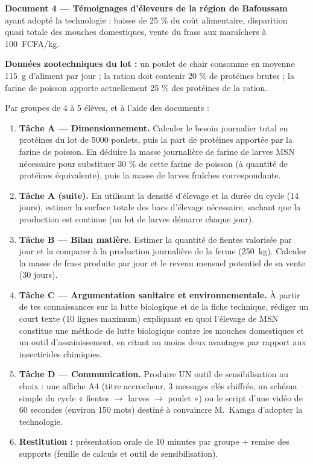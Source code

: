 \documentclass[11pt]{article}
\newcounter{popsec}
\newcounter{popsub}
\newcommand{\courssub}[1]{%
  \stepcounter{popsub}%
  \par\vspace{9pt}\noindent{\popxbold\fontsize{11.5}{13}\selectfont\color{popink}{\color{poporange}\thepopsec.\thepopsub}\hspace{6pt}#1}\par\nopagebreak\vspace{4pt}
}
\begin{document}
\textbf{Document 4 — Témoignages d'éleveurs de la région de Bafoussam} ayant adopté la technologie : baisse de 25 \% du coût alimentaire, disparition quasi totale des mouches domestiques, vente du frass aux maraîchers à \SI{100}{FCFA/kg}.

\textbf{Données zootechniques du lot :} un poulet de chair consomme en moyenne \SI{115}{g} d'aliment par jour ; la ration doit contenir 20 \% de protéines brutes ; la farine de poisson apporte actuellement 25 \% des protéines de la ration.

\courssub{Consignes}

Par groupes de 4 à 5 élèves, et à l'aide des documents :

\begin{enumerate}
\item \textbf{Tâche A — Dimensionnement.} Calculer le besoin journalier total en protéines du lot de \num{5000} poulets, puis la part de protéines apportée par la farine de poisson. En déduire la masse journalière de farine de larves MSN nécessaire pour substituer 30 \% de cette farine de poisson (à quantité de protéines équivalente), puis la masse de larves fraîches correspondante.
\item \textbf{Tâche A (suite).} En utilisant la densité d'élevage et la durée du cycle (14 jours), estimer la surface totale des bacs d'élevage nécessaire, sachant que la production est continue (un lot de larves démarre chaque jour).
\item \textbf{Tâche B — Bilan matière.} Estimer la quantité de fientes valorisée par jour et la comparer à la production journalière de la ferme (\SI{250}{kg}). Calculer la masse de frass produite par jour et le revenu mensuel potentiel de sa vente (30 jours).
\item \textbf{Tâche C — Argumentation sanitaire et environnementale.} À partir de tes connaissances sur la lutte biologique et de la fiche technique, rédiger un court texte (10 lignes maximum) expliquant en quoi l'élevage de MSN constitue une méthode de lutte biologique contre les mouches domestiques et un outil d'assainissement, en citant au moins deux avantages par rapport aux insecticides chimiques.
\item \textbf{Tâche D — Communication.} Produire UN outil de sensibilisation au choix : une affiche A4 (titre accrocheur, 3 messages clés chiffrés, un schéma simple du cycle « fientes $\rightarrow$ larves $\rightarrow$ poulet ») ou le script d'une vidéo de 60 secondes (environ 150 mots) destiné à convaincre M.~Kamga d'adopter la technologie.
\item \textbf{Restitution :} présentation orale de 10 minutes par groupe + remise des supports (feuille de calculs et outil de sensibilisation).
\end{enumerate}
\end{document}
